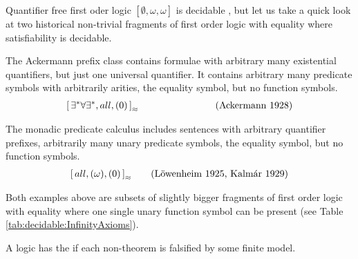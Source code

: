 \noindent
Quantifier free first oder logic \([\emptyset, \omega, \omega ]\) is decidable \cite{Kroening:2008:DPA:1391237}, 
but let us take a quick look at two historical non-trivial fragments of first order logic with equality where satisfiability is decidable.

\begin{example}\label{ex:ackermann}
	The Ackermann prefix class contains formulae with arbitrary many existential quantifiers,
	but just one universal quantifier. It contains arbitrary many predicate symbols
	with arbitrarily arities, the equality symbol, but no function symbols.
	\begin{gather*}
	{[\,\exists^*\forall\exists^*,all,(0) \,]}_{\approx}\qquad\qquad\qquad
	\tag{Ackermann 1928}
	\end{gather*}
\end{example}

\begin{example}\label{ex:monadic}
	The monadic predicate calculus includes sentences with arbitrary quantifier prefixes,
	arbitrarily many unary predicate symbols, the equality symbol, but no function symbols.
	\begin{gather*}
	{[\,all, (\omega), (0 ) \,]}_{\approx}
	\tag{Löwenheim 1925, Kalmár 1929}
	\end{gather*}
\end{example}

Both examples above are subsets of slightly bigger fragments of first order logic 
with equality where one single unary function symbol can be present
(see Table \ref{tab:decidable:InfinityAxioms}).

\begin{definition}\label{def:finite:model:property}
	A logic has the  if each non-theorem is falsified by some finite model.
\end{definition}




